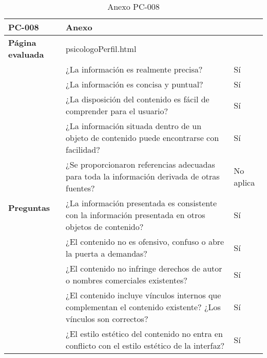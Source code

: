 \begin{table}[htpb]
\centering
\begin{tabularx}{\textwidth}{|l|X|l|}
\hline
\textbf{PC-008}                       & \multicolumn{2}{l|}{Anexo}                                                                                                \\ \hline
\textbf{Página evaluada}             & \multicolumn{2}{l|}{psicologoPerfil.html}                                                                                 \\ \hline
\multirow{10}{*}{\textbf{Preguntas}} & ¿La información es realmente precisa?                                                                         & Sí        \\ \cline{2-3} 
                                     & ¿La información es concisa y puntual?                                                                         & Sí        \\ \cline{2-3} 
                                     & ¿La disposición del contenido es fácil de comprender para el usuario?                                         & Sí        \\ \cline{2-3} 
                                     & ¿La información situada dentro de un objeto de contenido puede encontrarse con facilidad?                     & Sí        \\ \cline{2-3} 
                                     & ¿Se proporcionaron referencias adecuadas para toda la información derivada de otras fuentes?                  & No aplica \\ \cline{2-3} 
                                     & ¿La información presentada es consistente con la información presentada en otros objetos de contenido?        & Sí        \\ \cline{2-3} 
                                     & ¿El contenido no es ofensivo, confuso o abre la puerta a demandas?                                            & Sí        \\ \cline{2-3} 
                                     & ¿El contenido no infringe derechos de autor o nombres comerciales existentes?                                 & Sí        \\ \cline{2-3} 
                                     & ¿El contenido incluye vínculos internos que complementan el contenido existente? ¿Los vínculos son correctos? & Sí        \\ \cline{2-3} 
                                     & ¿El estilo estético del contenido no entra en conflicto con el estilo estético de la interfaz?                & Sí        \\ \hline
\end{tabularx}
\caption{Anexo PC-008}
\end{table}


